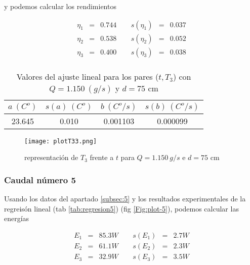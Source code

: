 \documentclass[12pt,a4paper]{article}
\begin{document}
 y podemos calcular los rendimientos 
 
\begin{equation} 
\begin{array}{lllllll}
\eta_1 & = & 0.744  &  \ \ &  s(\eta_1) & =  & 0.037   \\ 
 \eta_2 & = & 0.538  &  \ \ &  s(\eta_2) & =  & 0.052   \\ 
 \eta_3 & = & 0.400  &  \ \ &  s(\eta_3) & =  & 0.038   \\ 
 \end{array} 
\end{equation} 
 
 \begin{table}[h!] 	 \centering 
\begin{tabular}{|c|c|c|c|} 
\hline 
$a \ (C^o)$ & $s(a) \ (C^o)$ & $ b \ (C^o/s)$ & $s(b) \ (C^o/s)$  \\ \hline 
23.645  & 0.010 &  0.001103 & 0.000099 \\ 
\hline
\end{tabular} 
\caption{Valores del ajuste lineal para los pares ($t,T_3$) con $Q=1.150 \ (g/s)$ y $d= 75 $ cm} 
\label{tab:regresion4} 
\end{table} 
 
 
\begin{figure}[h!] 	 \centering 
\texttt{[image: plotT33.png]} 
\caption{representación de $T_3$ frente a $t$ para $Q = 1.150 \ g/s$ e $d = 75$ cm} 
\label{Fig:plot-4}  
\end{figure} 
 
\newpage 
 
 
 
 
\subsubsection{Caudal número 5} 
 
Usando los datos del apartado \ref{subsec:5} y los  resultados experimentales de la regreisón lineal (tab \ref{tab:regresion5}) (fig \ref{Fig:plot-5}), podemos calcular las energías 
 
 \begin{equation} 
\begin{array}{lllllll}
E_1 & = & 85.3 W &  \ \ &  s(E_1) & =  & 2.7  W \\ 
 E_2 & = & 61.1 W &  \ \ &  s(E_2) & =  & 2.3  W \\ 
 E_3 & = & 32.9 W &  \ \ &  s(E_3) & =  & 3.5  W \\ 
 \end{array} 
\end{equation} 
 
\end{document}

